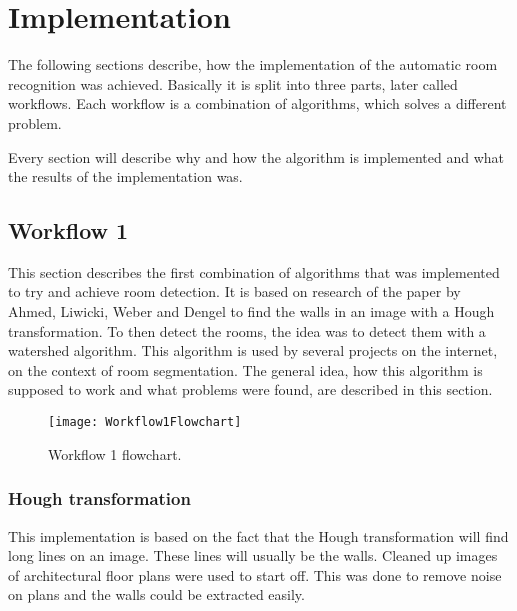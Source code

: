 \section{Implementation}
The following sections describe, how the implementation of the automatic room recognition was achieved. Basically it is split into three parts, later called workflows. Each workflow is a combination of algorithms, which solves a different problem.

Every section will describe why and how the algorithm is implemented and what the results of the implementation was.

\subsection{Workflow 1}
\label{sub:workflow1}
This section describes the first combination of algorithms that was implemented to try and achieve room detection. It is based on research of the paper by Ahmed, Liwicki, Weber and Dengel \citep{mace_valveny_loctea_tabbone_2010} to find the walls in an image with a Hough transformation. To then detect the rooms, the idea was to detect them with a watershed algorithm. This algorithm is used by several projects on the internet, on the context of room segmentation. The general idea, how this algorithm is supposed to work and what problems were found, are described in this section.

\begin{figure}[H]
	\centering
	\texttt{[image: Workflow1Flowchart]}
	\caption{Workflow 1 flowchart.}
	\label{fig:Workflow1Flowchart}
\end{figure}

\subsubsection{Hough transformation}
This implementation is based on the fact that the Hough transformation will find long lines on an image. These lines will usually be the walls. Cleaned up images of architectural floor plans were used to start off. This was done to remove noise on plans and the walls could be extracted easily.

